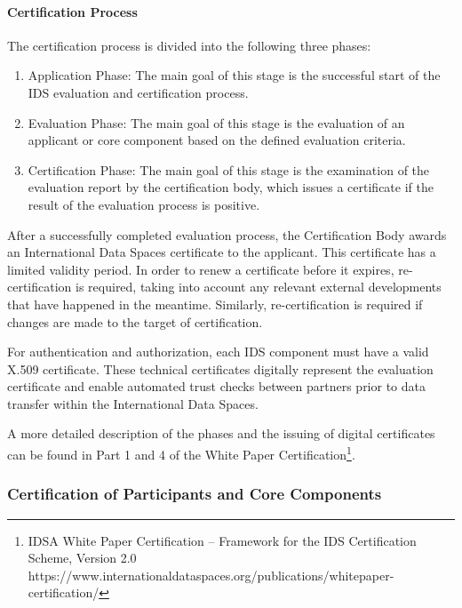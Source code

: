\paragraph{Certification Process \\}
The certification process is divided into the following three phases:

\begin{enumerate}
	\item Application Phase: The main goal of this stage is the successful start of the IDS evaluation and certification process.

	\item Evaluation Phase: The main goal of this stage is the evaluation of an applicant or core component based on the defined evaluation criteria.

	\item Certification Phase: The main goal of this stage is the examination of the evaluation report by the certification body, which issues a certificate if the result of the evaluation process is positive.

\end{enumerate}

After a successfully completed evaluation process, the Certification Body awards an International Data Spaces certificate to the applicant. This certificate has a limited validity period. In order to renew a certificate before it expires, re-certification is required, taking into account any relevant external developments that have happened in the meantime. Similarly, re-certification is required if changes are made to the target of certification.


For authentication and authorization, each IDS component must have a valid X.509 certificate. These technical certificates digitally represent the evaluation certificate and enable automated trust checks between partners prior to data transfer within the International Data Spaces.


A more detailed description of the phases and the issuing of digital certificates can be found in Part 1 and 4 of the White Paper Certification\footnote{ IDSA White Paper Certification – Framework for the IDS Certification Scheme, Version 2.0 https://www.internationaldataspaces.org/publications/whitepaper-certification/ }.


\subsubsection{Certification of Participants and Core Components}
